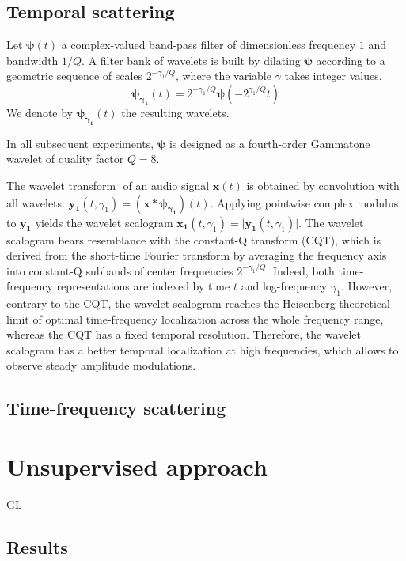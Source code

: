 \documentclass[journal]{IEEEtran}
\begin{document}
\subsection{Temporal scattering}
Let $\boldsymbol{\psi}(t)$ a complex-valued band-pass filter of
dimensionless frequency $1$ and bandwidth $1/Q$.
A filter bank of wavelets is built by dilating $\boldsymbol{\psi}$
according to a geometric sequence of scales $2^{-\gamma_1/Q}$,
where the variable $\gamma$ takes integer values.
\begin{equation}
\boldsymbol{\psi_{\gamma_1}}(t) = 2^{-\gamma_1/Q} \boldsymbol{\psi}(-2^{\gamma_1/Q} t)
\end{equation}
We denote by $\boldsymbol{\psi_{\gamma_1}}(t)$ the resulting wavelets.

In all subsequent experiments,
$\boldsymbol{\psi}$ is designed as a fourth-order Gammatone
wavelet of quality factor $Q = 8$.

The wavelet transform $\boldsymbol{}$ of an audio signal
$\boldsymbol{x}(t)$ is obtained by convolution with all wavelets:
$\boldsymbol{y_1}(t, \gamma_1) =
(\boldsymbol{x} \ast \boldsymbol{\psi_{\gamma_1}})(t)$.
Applying pointwise complex modulus to $\boldsymbol{y_1}$ yields
the wavelet scalogram
$\boldsymbol{x_1}(t, \gamma_1) = \vert \boldsymbol{y_1}(t, \gamma_1)\vert$.
The wavelet scalogram bears resemblance with the constant-Q transform (CQT),
which is derived from the short-time Fourier transform by averaging the frequency
axis into constant-Q subbands of center frequencies $2^{-\gamma_1/Q}$.
Indeed, both time-frequency representations are indexed by time $t$ and log-frequency $\gamma_1$.
However, contrary to the CQT, the wavelet scalogram reaches the Heisenberg
theoretical limit of optimal time-frequency localization across the whole
frequency range, whereas the CQT has a fixed temporal resolution.
Therefore, the wavelet scalogram has a better temporal localization at high
frequencies, which allows to observe steady amplitude modulations.

\subsection{Time-frequency scattering}

\section{Unsupervised approach}

GL

\subsection{Results}
\end{document}
